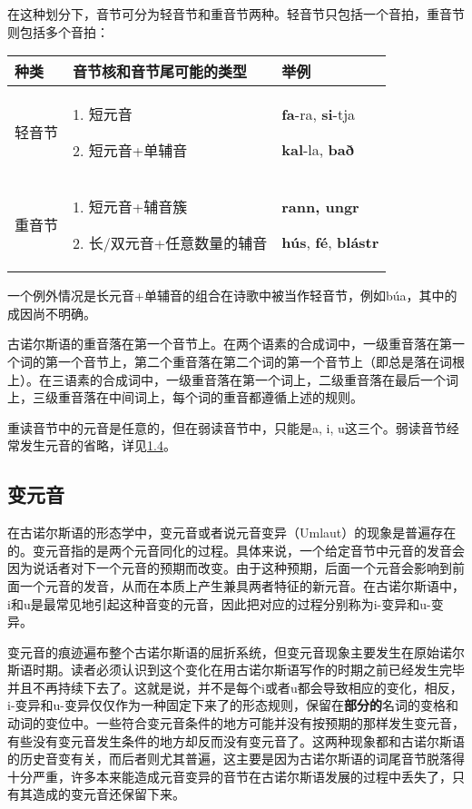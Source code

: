 在这种划分下，音节可分为轻音节和重音节两种。轻音节只包括一个音拍，重音节则包括多个音拍：

\begin{longtable}{lll}
\toprule
种类 & 音节核和音节尾可能的类型 & 举例 \\
\midrule
\endhead
\bottomrule
\endfoot
轻音节 & 1. 短元音

2. 短元音+单辅音 & \textbf{fa}-ra, \textbf{si}-tja

\textbf{kal}-la, \textbf{bað} \\
重音节 & 1. 短元音+辅音簇

2. 长/双元音+任意数量的辅音 & \textbf{rann, ungr}

\textbf{hús}, \textbf{fé}, \textbf{blástr} \\
\end{longtable}

一个例外情况是长元音+单辅音的组合在诗歌中被当作轻音节，例如búa，其中的成因尚不明确。

古诺尔斯语的重音落在第一个音节上。在两个语素的合成词中，一级重音落在第一个词的第一个音节上，第二个重音落在第二个词的第一个音节上（即总是落在词根上）。在三语素的合成词中，一级重音落在第一个词上，二级重音落在最后一个词上，三级重音落在中间词上，每个词的重音都遵循上述的规则。

重读音节中的元音是任意的，但在弱读音节中，只能是a, i,
u这三个。弱读音节经常发生元音的省略，详见\hyperref[ux8bedux97f3ux89c4ux5219]{1.4}。

\subsection{变元音}\label{ux53d8ux5143ux97f3}

在古诺尔斯语的形态学中，变元音或者说元音变异（Umlaut）的现象是普遍存在的。变元音指的是两个元音同化的过程。具体来说，一个给定音节中元音的发音会因为说话者对下一个元音的预期而改变。由于这种预期，后面一个元音会影响到前面一个元音的发音，从而在本质上产生兼具两者特征的新元音。在古诺尔斯语中，i和u是最常见地引起这种音变的元音，因此把对应的过程分别称为i-变异和u-变异。

变元音的痕迹遍布整个古诺尔斯语的屈折系统，但变元音现象主要发生在原始诺尔斯语时期。读者必须认识到这个变化在用古诺尔斯语写作的时期之前已经发生完毕并且不再持续下去了。这就是说，并不是每个i或者u都会导致相应的变化，相反，i-变异和u-变异仅仅作为一种固定下来了的形态规则，保留在\textbf{部分的}名词的变格和动词的变位中。一些符合变元音条件的地方可能并没有按预期的那样发生变元音，有些没有变元音发生条件的地方却反而没有变元音了。这两种现象都和古诺尔斯语的历史音变有关，而后者则尤其普遍，这主要是因为古诺尔斯语的词尾音节脱落得十分严重，许多本来能造成元音变异的音节在古诺尔斯语发展的过程中丢失了，只有其造成的变元音还保留下来。

